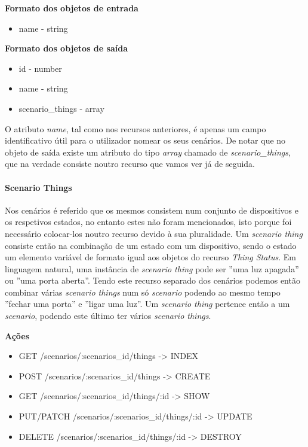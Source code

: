 \textbf{Formato dos objetos de entrada}
\begin{itemize}
    \item name - string
\end{itemize}

\textbf{Formato dos objetos de saída}
\begin{itemize}
    \item id - number
    \item name - string
    \item scenario\_things - array
\end{itemize}

O atributo \textit{name}, tal como nos recursos anteriores, é apenas um campo identificativo útil para o utilizador nomear os seus cenários. De notar que no objeto de saída existe um atributo do tipo \textit{array} chamado de \textit{scenario\_things}, que na verdade consiste noutro recurso que vamos ver já de seguida.

\paragraph*{Scenario Things}

Nos cenários é referido que os mesmos consistem num conjunto de dispositivos e os respetivos estados, no entanto estes não foram mencionados, isto porque foi necessário colocar-los noutro recurso devido à sua pluralidade. Um \textit{scenario thing} consiste então na combinação de um estado com um dispositivo, sendo o estado um elemento variável de formato igual aos objetos do recurso \textit{Thing Status}. Em linguagem natural, uma instância de \textit{scenario thing} pode ser ''uma luz apagada'' ou ''uma porta aberta''. Tendo este recurso separado dos cenários podemos então combinar várias \textit{scenario things} num só \textit{scenario} podendo ao mesmo tempo ''fechar uma porta'' e ''ligar uma luz''. Um \textit{scenario thing} pertence então a um \textit{scenario}, podendo este último ter vários \textit{scenario things}.

\textbf{Ações}
\begin{itemize}
    \item GET /scenarios/:scenarios\_id/things -> INDEX
    \item POST /scenarios/:scenarios\_id/things -> CREATE
    \item GET /scenarios/:scenarios\_id/things/:id -> SHOW
    \item PUT/PATCH /scenarios/:scenarios\_id/things/:id -> UPDATE
    \item DELETE /scenarios/:scenarios\_id/things/:id -> DESTROY
\end{itemize}

